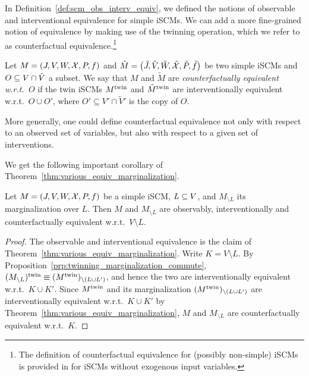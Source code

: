 In Definition~\ref{def:scm_obs_interv_equiv}, we defined the notions of observable and interventional equivalence for simple iSCMs. 
We can add a more fine-grained notion of equivalence by making use of the twinning operation, which we refer to as counterfactual equivalence.\footnote{The definition of counterfactual equivalence for (possibly non-simple) iSCMs is provided in \cite{BFPM21} for iSCMs without exogenous input variables.}
\begin{Def}\label{def:scm_counterfactual_equiv}
  Let $M = \left ( J, V, W, \mathcal{X}, P, f \right )$ and
  $\tilde{M} = \left ( \tilde{J}, \tilde{V}, \tilde{W}, \tilde{\mathcal{X}}, \tilde{P}, \tilde{f} \right )$ be two simple iSCMs
  and $O \subseteq V \cap \tilde{V}$ a subset.
  We say that $M$ and $\tilde{M}$ are \emph{counterfactually equivalent w.r.t.\ $O$} if the twin iSCMs $M^{\mathrm{twin}}$ and $\tilde{M}^{\mathrm{twin}}$ are interventionally equivalent w.r.t.\ $O \cup O'$, where
    $O' \subseteq V' \cap \tilde{V}'$ is the copy of $O$.
\end{Def}
More generally, one could define counterfactual equivalence not only with respect to an observed set of variables, but also with respect to a given set of interventions.

We get the following important corollary of Theorem~\ref{thm:various_equiv_marginalization}.
\begin{Cor}\label{Cor:various_equiv_marginalization}
  Let $M = \left ( J, V, W, \mathcal{X}, P, f \right )$ be a simple iSCM, $L \subseteq V$, and
  $M_{\setminus L}$ its marginalization over $L$. Then $M$ and $M_{\setminus L}$ are observably,
  interventionally and counterfactually equivalent w.r.t.\ $V \setminus L$.
\end{Cor}
\begin{proof}
  The observable and interventional equivalence is the claim of Theorem~\ref{thm:various_equiv_marginalization}.
  Write $K = V \setminus L$.
  By Proposition~\ref{prp:twinning_marginalization_commute}, $(M_{\setminus L})^{\mathrm{twin}} \equiv (M^{\mathrm{twin}})_{\setminus (L \cup L')}$, and hence the two are interventionally equivalent w.r.t.\ $K \cup K'$.
  Since $M^{\mathrm{twin}}$ and its marginalization $(M^{\mathrm{twin}})_{\setminus (L \cup L')}$ are interventionally equivalent w.r.t.\ $K \cup K'$ by Theorem~\ref{thm:various_equiv_marginalization}, $M$ and $M_{\setminus L}$ are counterfactually equivalent w.r.t.\ $K$.
\end{proof}

